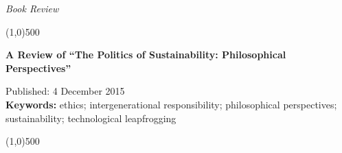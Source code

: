 \documentclass[10pt,a4paper]{article}
\begin{document}
\flushcolumns
\raggedcolumns



\pagestyle{document}
\thispagestyle{firstpage}


\vspace*{50pt}
\setlength{\parindent}{0cm}


\textit{Book Review}
\vspace*{-12pt}

\begin{center}
\line(1,0){500}
\end{center}

\vspace*{6pt}
\begin{flushleft}
\begin{LARGE}
\textbf{{\color{librelloCOLOR} A Review of ``The Politics of Sustainability: Philosophical Perspectives''}}\\
\end{LARGE}
\vspace*{6pt}
Published: 4 December 2015\\
\vspace*{6pt}
\textbf{{\color{librelloCOLOR}Keywords:}} ethics; intergenerational responsibility; philosophical perspectives; sustainability; technological leapfrogging
\end{flushleft}

\vspace*{-18pt}
\begin{center}
\line(1,0){500}
\end{center}
\setcounter{page}{18}

\vspace*{12mm}
\end{document}
